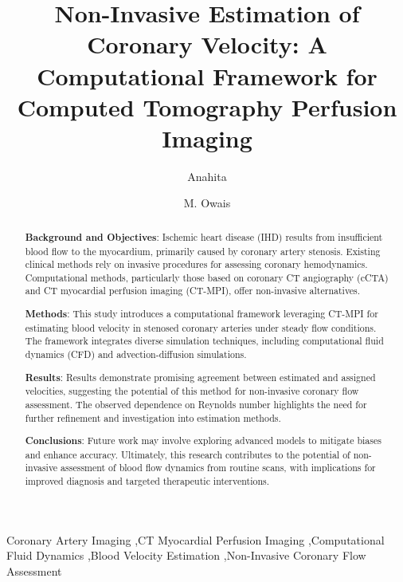 \documentclass[times,twocolumn,final]{elsarticle}
\begin{document}

\begin{frontmatter}

\title{Non-Invasive Estimation of Coronary Velocity: A Computational Framework for Computed Tomography Perfusion Imaging }%


\author[1]{Anahita }

\author[2]{M. Owais }


\address[1]{Department of Electrical, Computer and Biomedical Engineering, Toronto Metropolitan University, 350 Victoria Street, Toronto, M5B 0A1, Canada}




\begin{abstract}
    
\textbf{Background and Objectives}: Ischemic heart disease (IHD) results from insufficient blood flow to the myocardium, primarily caused by coronary artery stenosis. Existing clinical methods rely on invasive procedures for assessing coronary hemodynamics. Computational methods, particularly those based on coronary CT angiography (cCTA) and CT myocardial perfusion imaging (CT-MPI), offer non-invasive alternatives.

\textbf{Methods}: This study introduces a computational framework leveraging CT-MPI for estimating blood velocity in stenosed coronary arteries under steady flow conditions. The framework integrates diverse simulation techniques, including computational fluid dynamics (CFD) and advection-diffusion simulations. 

\textbf{Results}: Results demonstrate promising agreement between estimated and assigned velocities, suggesting the potential of this method for non-invasive coronary flow assessment. The observed dependence on Reynolds number highlights the need for further refinement and investigation into estimation methods.

\textbf{Conclusions}: Future work may involve exploring advanced models to mitigate biases and enhance accuracy. Ultimately, this research contributes to the potential of non-invasive assessment of blood flow dynamics from routine scans, with implications for improved diagnosis and targeted therapeutic interventions.
\end{abstract}


\begin{keyword}
\KWD Coronary Artery Imaging \sep CT Myocardial Perfusion Imaging \sep Computational Fluid Dynamics \sep Blood Velocity Estimation \sep Non-Invasive Coronary Flow Assessment
\end{keyword}


\end{frontmatter}
\end{document}
